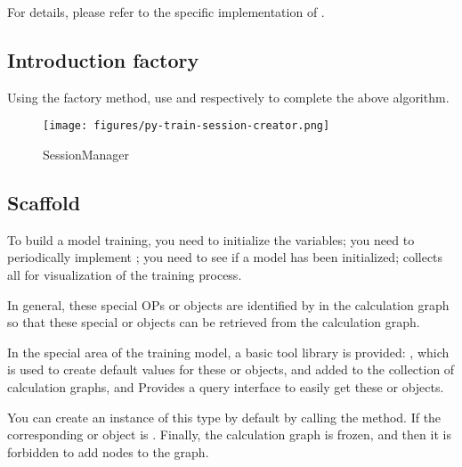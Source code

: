 \begin{content}
\begin{enum}
\end{enum}

For details, please refer to the specific implementation of .

\subsection{Introduction factory}

Using the factory method, use  and  respectively to complete the above algorithm.

\begin{figure}[!htbp]
\centering
\texttt{[image: figures/py-train-session-creator.png]}
\caption{SessionManager}
 \label{fig:py-train-session-creator}
\end{figure}

\subsection{Scaffold}

To build a model training, you need  to initialize the variables; you need  to periodically implement ; you need  to see if a model has been initialized;  collects all  for visualization of the training process.

In general, these special OPs or objects are identified by  in the calculation graph so that these special  or objects can be retrieved from the calculation graph.

In the special area of ​​the training model, a basic tool library is provided: , which is used to create default values ​​for these  or objects, and added to the collection of calculation graphs, and  Provides a query interface to easily get these  or objects.

You can create an instance of this type by default by calling the  method. If the corresponding  or object is . Finally, the calculation graph is frozen, and then it is forbidden to add nodes to the graph.


\end{content}
